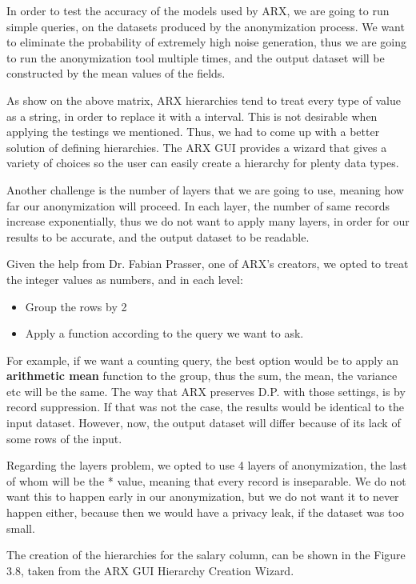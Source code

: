In order to test the accuracy of the models used by ARX, we are going to run simple queries, on the datasets produced by the anonymization process. We want to eliminate the probability of extremely high noise generation, thus we are going to run the anonymization tool multiple times, and the output dataset will be constructed by the mean values of the fields.

As show on the above matrix, ARX hierarchies tend to treat every type of value as a string, in order to replace it with a interval. This is not  desirable when applying the testings we mentioned. Thus, we had to come up with a better solution of defining hierarchies. The ARX GUI provides a wizard that gives a variety of choices so the user can easily create a hierarchy for plenty data types.

Another challenge is the number of layers that we are going to use, meaning how far our anonymization will proceed. In each layer, the number of same records increase exponentially, thus we do not want to apply many layers, in order for our results to be accurate, and the output dataset to be readable.

Given the help from Dr. Fabian Prasser, one of ARX's creators, we opted to treat the integer values as numbers, and in each level:
\begin{itemize}
    \item Group the rows by 2
    \item Apply a function according to the query we want to ask.
\end{itemize}
 
For example, if we want a counting query, the best option would be to apply an \textbf{arithmetic mean} function to the group, thus the sum, the mean, the variance etc will be the same. The way that ARX preserves D.P. with those settings, is by record suppression. If that was not the case, the results would be identical to the input dataset. However, now, the output dataset will differ because of its lack of some rows of the input.
 
Regarding the layers problem, we opted to use 4 layers of anonymization, the last of whom will be the * value, meaning that every record is inseparable. We do not want this to happen early in our anonymization, but we do not want it to never happen either, because then we would have a privacy leak, if the dataset was too small.

The creation of the hierarchies for the salary column, can be shown in the Figure 3.8, taken from the ARX GUI Hierarchy Creation Wizard.

